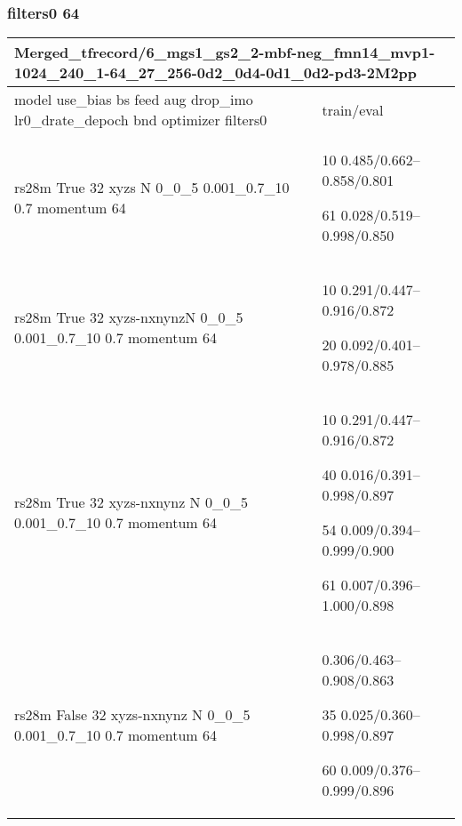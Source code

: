 \documentclass[,table,dvipsnames]{article}
\begin{document}
\subsubsection{filters0 64}
\noindent\begin{tabular}{|p{10cm}|p{5cm}| }	
	\hline
	\multicolumn{2}{|p{15cm}|}{Merged\_tfrecord/6\_mgs1\_gs2\_2-mbf-neg\_fmn14\_mvp1-1024\_240\_1-64\_27\_256-0d2\_0d4-0d1\_0d2-pd3-2M2pp}\\
	\hline
	model use\_bias bs feed aug drop\_imo lr0\_drate\_depoch bnd optimizer filters0 & train/eval \\
	
	
	
	\rowcolor{blue!20}
	rs28m True 32 xyzs N 0\_0\_5 0.001\_0.7\_10 0.7 momentum 64&
	10 0.485/0.662--0.858/0.801\par 61 0.028/0.519--0.998/0.850\\
	
	\rowcolor{green!20}
	rs28m True 32 xyzs-nxnynzN 0\_0\_5 0.001\_0.7\_10 0.7 momentum 64&
	10 0.291/0.447--0.916/0.872\par 20 0.092/0.401--0.978/0.885\\
	
	
	\rowcolor{green}
	rs28m True 32 xyzs-nxnynz N 0\_0\_5 0.001\_0.7\_10 0.7 momentum 64&
	10 0.291/0.447--0.916/0.872\par 40 0.016/0.391--0.998/0.897\par 54 0.009/0.394--0.999/0.900\par 61 0.007/0.396--1.000/0.898\\
	
	
	
	\rowcolor{blue!20}
	rs28m False 32 xyzs-nxnynz N 0\_0\_5 0.001\_0.7\_10 0.7 momentum 64&0.306/0.463--0.908/0.863\par 35 0.025/0.360--0.998/0.897\par 60 0.009/0.376--0.999/0.896\\
	
	\hline 
\end{tabular}
\end{document}
